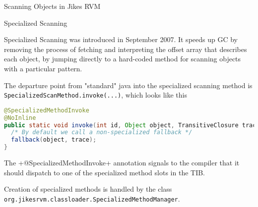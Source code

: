 \begin{section}{Scanning Objects in Jikes RVM}
\begin{subsection}{Specialized Scanning}

Specialized Scanning was introduced in September 2007.  It speeds up GC by removing the process of fetching and interpreting the offset array that describes each object, by jumping directly to a hard-coded method for scanning objects with a particular pattern.

The departure point from "standard" java into the specialized scanning method is \texttt{Spe\-cial\-iz\-ed\-Scan\-Me\-thod.in\-vo\-ke(...)}, which looks like this
\begin{lstlisting}[language=Java]
@SpecializedMethodInvoke
@NoInline
public static void invoke(int id, Object object, TransitiveClosure trace) {
  /* By default we call a non-specialized fallback */
  fallback(object, trace);
}
\end{lstlisting}

The \spverb+@SpecializedMethodInvoke+ annotation signals to the compiler that it should dispatch to one of the specialized method slots in the TIB.

Creation of specialized methods is handled by the class \texttt{org.jikes\-rvm.class\-loa\-der.Spe\-cial\-iz\-ed\-Me\-thod\-Ma\-na\-ger}.

\end{subsection}

\end{section}
